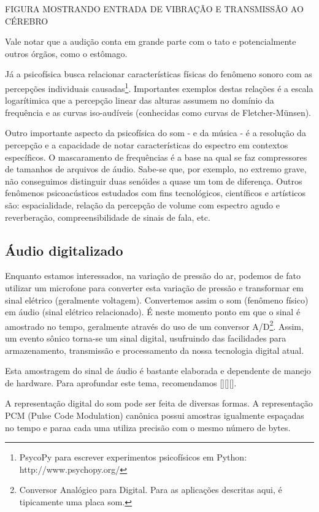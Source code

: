 FIGURA MOSTRANDO ENTRADA DE VIBRAÇÃO E TRANSMISSÃO AO CÉREBRO

Vale notar que a audição conta em grande parte com o tato e potencialmente
outros órgãos, como o estômago.

Já a psicofísica busca relacionar características físicas do fenômeno sonoro
com as percepções individuais causadas\footnote{PsycoPy para escrever experimentos psicofísicos em Python: http://www.psychopy.org/}.
Importantes exemplos destas relações
é a escala logarítimica que a percepção linear das alturas assumem no
domínio da frequência e as curvas iso-audíveis (conhecidas como curvas de Fletcher-Münsen).

Outro importante aspecto da psicofísica do som - e da música - é a resolução da percepção
e a capacidade de notar características do espectro em contextos específicos. O mascaramento
de frequências é a base na qual se faz compressores de tamanhos de arquivos de áudio. Sabe-se
que, por exemplo, no extremo grave, não conseguimos distinguir duas senóides a quase um tom de
diferença. Outros fenômenos psicoacústicos estudados com fins tecnológicos, científicos e artísticos são: espacialidade,
relação da percepção de volume com espectro agudo e reverberação, compreensibilidade de sinais de fala, etc.


\subsection{Áudio digitalizado}

Enquanto estamos interessados, na variação de pressão do ar, podemos de fato utilizar
um microfone para converter esta variação de pressão e transformar em sinal elétrico
(geralmente voltagem).
Convertemos assim o som (fenômeno físico) em áudio (sinal elétrico relacionado).
É neste momento ponto em que o sinal é amostrado no tempo, geralmente através do uso de
um conversor A/D\footnote{Conversor Analógico para Digital. Para as aplicações descritas aqui, é tipicamente uma placa som.}. Assim, um evento sônico
torna-se um sinal digital, usufruindo das facilidades para armazenamento, transmissão e
processamento da nossa tecnologia digital atual.

Esta amostragem do sinal de áudio é bastante elaborada e dependente de manejo de hardware. Para
aprofundar este tema, recomendamos [][][].

A representação digital do som pode ser feita de diversas formas.
A representação PCM (Pulse Code Modulation) canônica possui amostras
igualmente espaçadas no tempo e paraa cada uma utiliza precisão com o mesmo
número de bytes.


